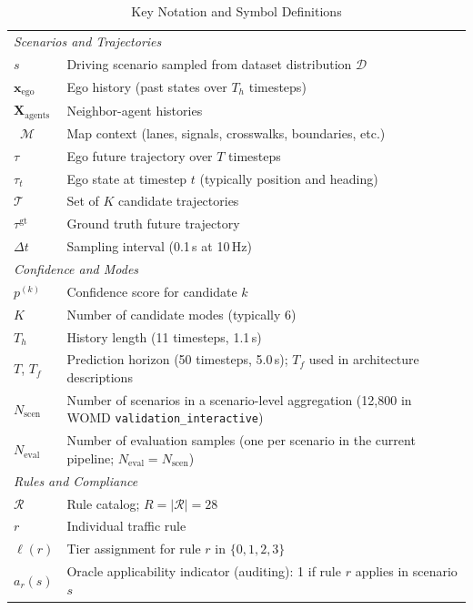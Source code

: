 \begin{table}
\centering
\small
\caption{Key Notation and Symbol Definitions}
\label{tab:notation}
\begin{tabular}{ll}
\toprule
\multicolumn{2}{l}{\textit{Scenarios and Trajectories}} \\
$s$ & Driving scenario sampled from dataset distribution $\mathcal{D}$ \\
$\mathbf{x}_{\text{ego}}$ & Ego history (past states over $T_h$ timesteps) \\
$\mathbf{X}_{\text{agents}}$ & Neighbor-agent histories \\\
$\mathcal{M}$ & Map context (lanes, signals, crosswalks, boundaries, etc.) \\
$\tau$ & Ego future trajectory over $T$ timesteps \\
$\tau_t$ & Ego state at timestep $t$ (typically position and heading) \\
$\mathcal{T}$ & Set of $K$ candidate trajectories \\
$\tau^{\mathrm{gt}}$ & Ground truth future trajectory \\
$\Delta t$ & Sampling interval (0.1\,s at 10\,Hz) \\
\midrule
\multicolumn{2}{l}{\textit{Confidence and Modes}} \\
$p^{(k)}$ & Confidence score for candidate $k$ \\
$K$ & Number of candidate modes (typically 6) \\
$T_h$ & History length (11 timesteps, 1.1\,s) \\
$T$, $T_f$ & Prediction horizon (50 timesteps, 5.0\,s); $T_f$ used in architecture descriptions \\
$N_{\text{scen}}$ & Number of scenarios in a scenario-level aggregation (12{,}800 in WOMD \texttt{validation\_interactive}) \\
$N_{\text{eval}}$ & Number of evaluation samples (one per scenario in the current pipeline; $N_{\text{eval}} = N_{\text{scen}}$) \\
\midrule
\multicolumn{2}{l}{\textit{Rules and Compliance}} \\
$\mathcal{R}$ & Rule catalog; $R = |\mathcal{R}| = 28$ \\
$r$ & Individual traffic rule \\
$\ell(r)$ & Tier assignment for rule $r$ in $\{0,1,2,3\}$ \\
$a_r(s)$ & Oracle applicability indicator (auditing): 1 if rule $r$ applies in scenario $s$ \\

\end{tabular}
\end{table}
